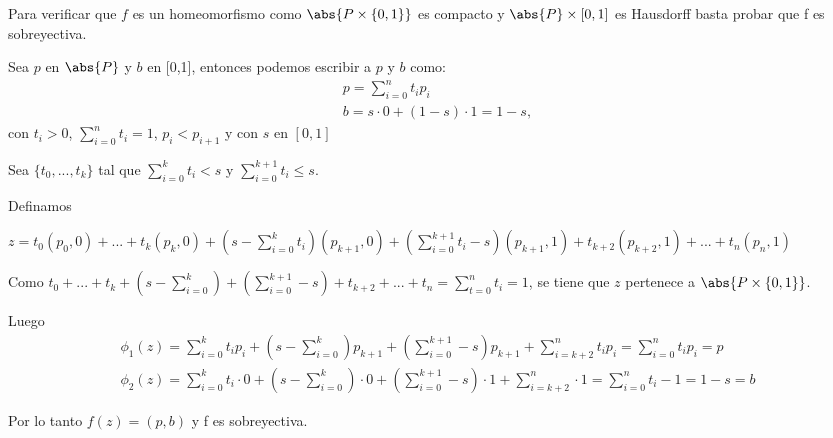 \begin{Dem}
Para verificar que $f$ es un homeomorfismo como $\abs{P\times\{0,1\}}$ es compacto y $\abs{P}\times[0,1]$ es Hausdorff basta probar que f es sobreyectiva. 

Sea $p$ en $\abs{P}$ y $b$ en [0,1], entonces podemos escribir a $p$ y $b$ como:
\begin{eqnarray}
p = \sum_{i=0}^{n}t_ip_i \\
b = s\cdot 0 + (1-s)\cdot 1 = 1-s, 
\end{eqnarray}
con $t_i>0$, $\sum_{i=0}^{n}t_i =1$, $p_i<p_{i+1}$ y con $s$ en $[0,1]$

Sea $\{t_0,...,t_k\} $ tal que $\sum_{i=0}^{k}t_i <s$ y $\sum_{i=0}^{k+1}t_i\leq s$.

Definamos

$z =t_0(p_0,0)+ ...+ t_k(p_k,0)+(s-\sum_{i=0}^{k}t_i)(p_{k+1},0)+(\sum_{i=0}^{k+1}t_i-s)(p_{k+1},1)+t_{k+2}(p_{k+2},1)+...+t_n(p_n,1)$ 

Como $t_0 +...+t_k+(s-\sum_{i=0}^{k})+(\sum_{i=0}^{k+1}-s)+t_{k+2}+...+t_n = \sum_{t=0}^{n}t_i = 1$, se tiene que $z$ pertenece a $\abs{P\times\{0,1\}}$.

Luego
\begin{eqnarray*}
\phi_1(z) = \sum_{i=0}^{k}t_ip_i + (s-\sum_{i=0}^{k})p_{k+1} +(\sum_{i=0}^{k+1}-s)p_{k+1} + \sum_{i = k+2}^{n}t_ip_i = \sum_{i=0}^{n}t_ip_i = p\\
\phi_2(z) = \sum_{i=0}^{k}t_i\cdot 0 + (s-\sum_{i=0}^{k})\cdot 0 +(\sum_{i=0}^{k+1}-s)\cdot 1 + \sum_{i = k+2}^{n}\cdot 1 = \sum_{i=0}^{n}t_i -1 = 1-s = b
\end{eqnarray*}

Por lo tanto $f(z)=(p,b)$ y f es sobreyectiva.
\end{Dem}

